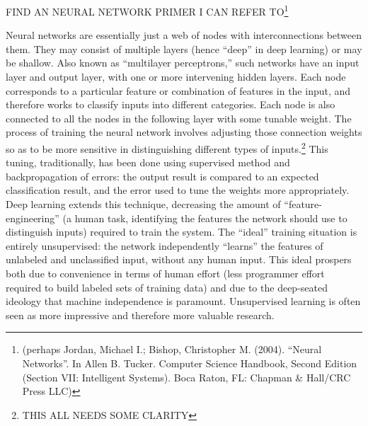 FIND AN NEURAL NETWORK PRIMER I CAN REFER TO\footnote{
(perhaps Jordan, Michael I.; Bishop, Christopher M. (2004). ``Neural
Networks''. In Allen B. Tucker. Computer Science Handbook, Second
Edition (Section VII: Intelligent Systems). Boca Raton, FL: Chapman &
Hall/CRC Press LLC)}

Neural networks are essentially just a web of nodes with
interconnections between them. They may consist of multiple layers
(hence ``deep'' in deep learning) or may be shallow. Also known as
``multilayer perceptrons,'' such networks have an input layer and
output layer, with one or more intervening hidden layers. Each node
corresponds to a particular feature or combination of features in the
input, and therefore works to classify inputs into different
categories. Each node is also connected to all the nodes in the
following layer with some tunable weight. The process of training the
neural network involves adjusting those connection weights so as to
be more sensitive in distinguishing different types of
inputs.\footnote{THIS ALL NEEDS SOME CLARITY} This tuning,
traditionally, has been done using supervised method and
backpropagation of errors: the output result is compared to an
expected classification result, and the error used to tune the weights
more appropriately. Deep learning extends this technique, decreasing
the amount of ``feature-engineering'' (a human task, identifying the
features the network should use to distinguish inputs) required to
train the system. The ``ideal'' training situation is entirely
unsupervised: the network independently ``learns'' the features of
unlabeled and unclassified input, without any human input. This ideal
prospers both due to convenience in terms of human effort (less
programmer effort required to build labeled sets of training data) and
due to the deep-seated ideology that machine independence is
paramount. Unsupervised learning is often seen as more impressive and
therefore more valuable research.\cite{???}







